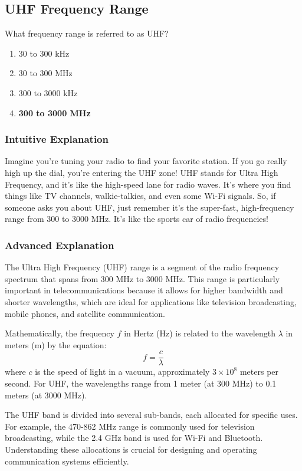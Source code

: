\subsection{UHF Frequency Range}
\label{T3B09}

\begin{tcolorbox}[colback=gray!10!white,colframe=black!75!black,title=T3B09]
What frequency range is referred to as UHF?
\begin{enumerate}[label=\Alph*)]
    \item 30 to 300 kHz
    \item 30 to 300 MHz
    \item 300 to 3000 kHz
    \item \textbf{300 to 3000 MHz}
\end{enumerate}
\end{tcolorbox}

\subsubsection*{Intuitive Explanation}
Imagine you're tuning your radio to find your favorite station. If you go really high up the dial, you're entering the UHF zone! UHF stands for Ultra High Frequency, and it's like the high-speed lane for radio waves. It's where you find things like TV channels, walkie-talkies, and even some Wi-Fi signals. So, if someone asks you about UHF, just remember it's the super-fast, high-frequency range from 300 to 3000 MHz. It's like the sports car of radio frequencies!

\subsubsection*{Advanced Explanation}
The Ultra High Frequency (UHF) range is a segment of the radio frequency spectrum that spans from 300 MHz to 3000 MHz. This range is particularly important in telecommunications because it allows for higher bandwidth and shorter wavelengths, which are ideal for applications like television broadcasting, mobile phones, and satellite communication.

Mathematically, the frequency \( f \) in Hertz (Hz) is related to the wavelength \( \lambda \) in meters (m) by the equation:
\[
f = \frac{c}{\lambda}
\]
where \( c \) is the speed of light in a vacuum, approximately \( 3 \times 10^8 \) meters per second. For UHF, the wavelengths range from 1 meter (at 300 MHz) to 0.1 meters (at 3000 MHz).

The UHF band is divided into several sub-bands, each allocated for specific uses. For example, the 470-862 MHz range is commonly used for television broadcasting, while the 2.4 GHz band is used for Wi-Fi and Bluetooth. Understanding these allocations is crucial for designing and operating communication systems efficiently.

